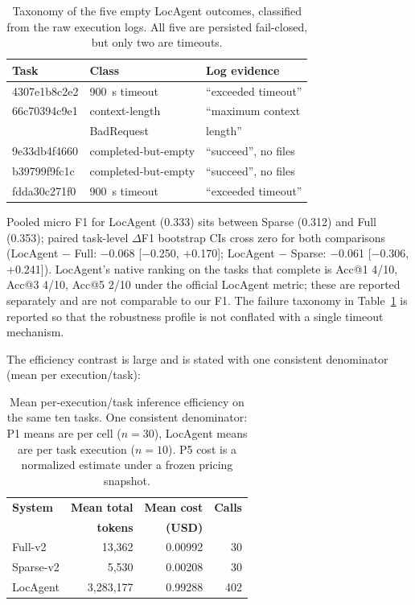 \begin{table}[t]
\caption{Taxonomy of the five empty LocAgent outcomes, classified from the raw
execution logs. All five are persisted fail-closed, but only two are timeouts.}
\label{tab:p5fail}
\centering
\scriptsize
\setlength{\tabcolsep}{3pt}
\begin{tabular}{lll}
\toprule
\textbf{Task} & \textbf{Class} & \textbf{Log evidence} \\
\midrule
4307e1b8c2e2 & 900~s timeout & ``exceeded timeout'' \\
66c70394c9e1 & context-length & ``maximum context\\
 & BadRequest & length'' \\
9e33db4f4660 & completed-but-empty & ``succeed'', no files \\
b39799f9fc1c & completed-but-empty & ``succeed'', no files \\
fdda30c271f0 & 900~s timeout & ``exceeded timeout'' \\
\bottomrule
\end{tabular}
\end{table}

Pooled micro F1 for LocAgent (0.333) sits between Sparse (0.312)
and Full (0.353); paired task-level $\Delta$F1 bootstrap CIs cross zero for
both comparisons (LocAgent $-$ Full: $-$0.068 [$-$0.250, $+$0.170]; LocAgent
$-$ Sparse: $-$0.061 [$-$0.306, $+$0.241]). LocAgent's native ranking on the
tasks that complete is Acc@1 4/10, Acc@3 4/10, Acc@5 2/10 under the official
LocAgent metric; these are reported separately and are not comparable to our
F1. The failure taxonomy in Table~\ref{tab:p5fail} is reported so that the
robustness profile is not conflated with a single timeout mechanism.

The efficiency contrast is large and is stated with one consistent denominator
(mean per execution/task):

\begin{table}[t]
\caption{Mean per-execution/task inference efficiency on the same ten tasks.
One consistent denominator: P1 means are per cell ($n=30$), LocAgent means are
per task execution ($n=10$). P5 cost is a normalized estimate under a frozen
pricing snapshot.}
\label{tab:efficiency}
\centering
\scriptsize
\setlength{\tabcolsep}{3pt}
\begin{tabular}{lrrr}
\toprule
\textbf{System} & \textbf{Mean total} & \textbf{Mean cost} & \textbf{Calls} \\
 & \textbf{tokens} & \textbf{(USD)} & \\
\midrule
Full-v2 & 13,362 & 0.00992 & 30 \\
Sparse-v2 & 5,530 & 0.00208 & 30 \\
LocAgent & 3,283,177 & 0.99288 & 402 \\
\bottomrule
\end{tabular}
\end{table}

